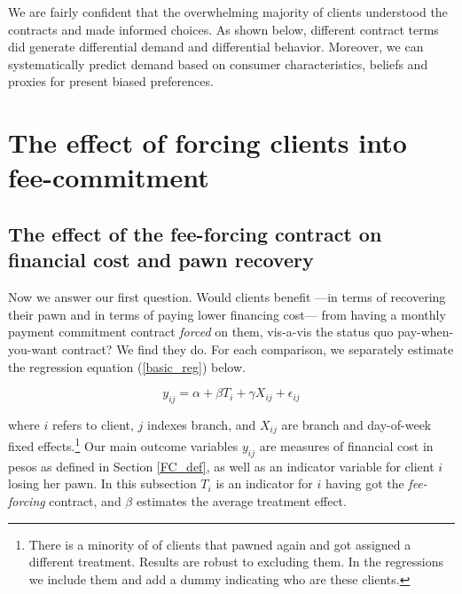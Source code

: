 \documentclass[11pt]{article}
\begin{document}
We are fairly confident that the overwhelming majority of clients understood the contracts and made informed choices. As shown below, different contract terms did generate differential demand and differential behavior. Moreover, we can systematically predict demand based on consumer characteristics, beliefs and proxies for present biased preferences.



\section{The effect of forcing clients into fee-commitment} \label{fee-commitment}



\subsection{The effect of the fee-forcing contract on financial cost and pawn recovery} \label{TE_fee-forcing}

Now we answer our first question. Would clients benefit ---in terms of recovering their pawn and in terms of paying lower financing cost--- from having a monthly payment commitment contract \textit{forced} on them, vis-a-vis the status quo pay-when-you-want contract? We find they do. For each comparison, we separately estimate the regression equation (\ref{basic_reg}) below.

\begin{equation} \label{basic_reg}
    y_{ij} = \alpha + \beta T_{i} + \gamma X_{ij} + \epsilon_{ij}
\end{equation}

\noindent where $i$ refers to client, $j$ indexes branch, and $X_{ij}$ are branch and day-of-week fixed effects.\footnote{There is a minority of of clients that pawned again and got assigned a different treatment. Results are robust to excluding them. In the regressions we include them and add a dummy indicating who are these clients.} %
Our main outcome variables $y_{ij}$ are measures of financial cost in pesos as defined in Section \ref{FC_def}, as well as an indicator variable for client $i$ losing her pawn. In this subsection $T_{i}$ is an indicator for $i$ having got the \textit{fee-forcing} contract, and $\beta$ estimates the average treatment effect.%
\end{document}
